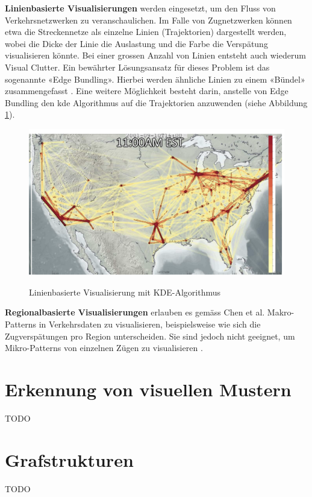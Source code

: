 \textbf{Linienbasierte Visualisierungen} werden eingesetzt, um den Fluss von Verkehrsnetzwerken zu veranschaulichen. Im Falle von Zugnetzwerken können etwa die Streckennetze als einzelne Linien (Trajektorien) dargestellt werden, wobei die Dicke der Linie die Auslastung und die Farbe die Verspätung visualisieren könnte. Bei einer grossen Anzahl von Linien entsteht auch wiederum Visual Clutter. Ein bewährter Lösungsansatz für dieses Problem ist das sogenannte «Edge Bundling». Hierbei werden ähnliche Linien zu einem «Bündel» zusammengefasst \parencite[S. 2974 - 2976]{survey_traffic_data_visualization_2015}. Eine weitere Möglichkeit besteht darin, anstelle von Edge Bundling den \acrshort{kde} Algorithmus auf die Trajektorien anzuwenden (siehe Abbildung \ref{fig_line_kde}).

\begin{figure}[H]
    \caption{Linienbasierte Visualisierung mit KDE-Algorithmus \parencite[S. 7]{streaming_data_kde}}
    \includegraphics[width=.5\linewidth]{content/00_assets/line_visualization_kde.png}
    \label{fig_line_kde}
\end{figure}

\textbf{Regionalbasierte Visualisierungen} erlauben es gemäss Chen et al. Makro-Patterns in Verkehrsdaten zu visualisieren, beispielsweise wie sich die Zugverspätungen pro Region unterscheiden. Sie sind jedoch nicht geeignet, um Mikro-Patterns von einzelnen Zügen zu visualisieren \parencite[S. 2976]{survey_traffic_data_visualization_2015}.

\section{Erkennung von visuellen Mustern}
TODO

\section{Grafstrukturen}
TODO


